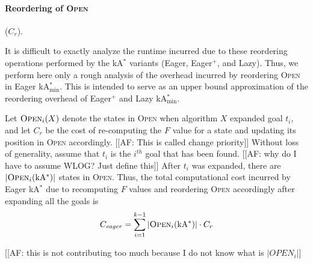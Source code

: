 \documentclass[twoside,11pt]{article}
\newcommand{\kastar}{kA$^*$\xspace}
\newcommand{\kastarvar}[1]{\textup{kA}$^*_{#1}$\xspace}
\newcommand{\kastarmin}{\kastarvar{\min}}
\newcommand{\open}{\textsc{Open}\xspace}
\begin{document}


\paragraph{Reordering of \open} ($C_r$).

It is difficult to exactly analyze the runtime incurred due to these reordering operations performed by the \kastar variants (Eager, Eager$^+$, and Lazy).
Thus, we perform here only a rough analysis of the overhead incurred by reordering \open in Eager \kastarmin.
This is intended to serve as an upper bound approximation of the reordering overhead of Eager$^+$ and Lazy \kastarmin.

Let $\open_i(X)$ denote the states in \open when algorithm $X$ expanded goal $t_i$, and let $C_r$ be the cost of re-computing the $F$ value for a state and updating its position in \open accordingly. [[AF: This is called change priority]]
Without loss of generality, assume that $t_i$ is the $i^{th}$ goal that has been found. [[AF: why do I have to assume WLOG? Just define this]]
After $t_i$ was expanded, there are $|\open_i(\text{\kastar})|$ states in \open.
Thus, the total computational cost incurred by Eager \kastar due to recomputing $F$ values and reordering \open accordingly after expanding all the goals is
\begin{equation}
  C_{\mathit{eager}}=\sum_{i=1}^{k-1} |\open_i(\text{\kastar})| \cdot C_r
  \label{eq:re-sort-cost}
\end{equation}

[[AF: this is not contributing too much because I do not know what is $|OPEN_i|$]
\end{document}
